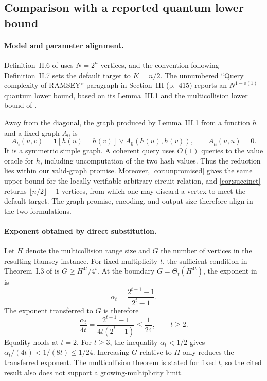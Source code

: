 \subsection{Comparison with a reported quantum lower bound}
\label{sec:jlrx}

\paragraph{Model and parameter alignment.}
Definition~II.6 of \cite{JainLiRobereXun2024} uses $N=2^n$ vertices, and the
convention following Definition~II.7 sets the default target to $K=n/2$.
The unnumbered ``Query complexity of RAMSEY'' paragraph in Section~III
(p.~415) reports an $N^{1-o(1)}$ quantum lower bound, based on its
Lemma~III.1 and the multicollision lower bound of \cite{LiuZhandry2019}.

Away from the diagonal, the graph produced by Lemma~III.1 from a function
$h$ and a fixed graph $A_0$ is
\[
 A_h(u,v)=\mathbf 1[h(u)=h(v)]\lor A_0(h(u),h(v)),
 \qquad A_h(u,u)=0.
\]
It is a symmetric simple graph.  A coherent query uses $O(1)$ queries to the
value oracle for $h$, including uncomputation of the two hash values.  Thus
the reduction lies within our valid-graph promise.  Moreover,
\cref{cor:unpromised} gives the same upper bound for the locally verifiable
arbitrary-circuit relation, and \cref{cor:succinct} returns
$\lfloor n/2\rfloor+1$ vertices, from which one may discard a vertex to meet
the default target.  The graph promise, encoding, and output size therefore
align in the two formulations.

\paragraph{Exponent obtained by direct substitution.}
Let $H$ denote the multicollision range size and $G$ the number of vertices in
the resulting Ramsey instance.  For fixed multiplicity $t$, the sufficient
condition in Theorem~I.3 of \cite{JainLiRobereXun2024} is
$G\ge H^{4t}/4^t$.  At the boundary $G=\Theta_t(H^{4t})$, the exponent in
\cite{LiuZhandry2019} is
\[
 \alpha_t=\frac{2^{t-1}-1}{2^t-1}.
\]
The exponent transferred to $G$ is therefore
\[
 \frac{\alpha_t}{4t}
 =\frac{2^{t-1}-1}{4t(2^t-1)}
 \le \frac1{24},
 \qquad t\ge2.
\]
Equality holds at $t=2$.  For $t\ge3$, the inequality
$\alpha_t<1/2$ gives
$\alpha_t/(4t)<1/(8t)\le1/24$.  Increasing $G$ relative to $H$ only reduces
the transferred exponent.  The multicollision theorem is stated for fixed
$t$, so the cited result also does not support a growing-multiplicity limit.

